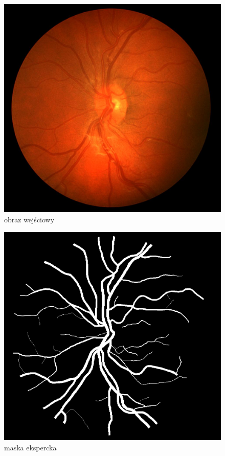 \documentclass[polish,polish,a4paper]{article}
\begin{document}
\begin{figure}[!h]
	\centering
	\begin{minipage}{0.26\linewidth}
		\includegraphics[width=\linewidth]{../chase/Image_04L.jpg}
		\centering
			\small{obraz wejściowy}
	\end{minipage}
	\hfill
	\begin{minipage}{0.26\linewidth}
		\includegraphics[width=\linewidth]{../chase/Image_04L_1stHO.png}
		\centering
			\small{maska ekspercka}
	\end{minipage}
\end{figure}



\end{document}
